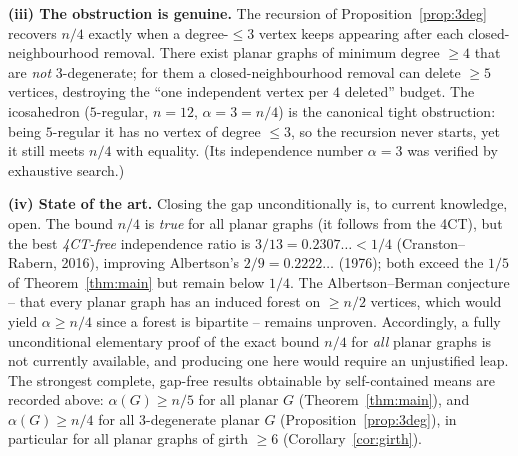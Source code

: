 \documentclass{amsart}
\theoremstyle{remark}
\begin{document}
\medskip
\noindent\textbf{(iii) The obstruction is genuine.}
The recursion of Proposition~\ref{prop:3deg} recovers $n/4$ exactly when a
degree-$\le3$ vertex keeps appearing after each closed-neighbourhood removal.
There exist planar graphs of minimum degree $\ge4$ that are \emph{not}
$3$-degenerate; for them a closed-neighbourhood removal can delete $\ge5$
vertices, destroying the ``one independent vertex per $4$ deleted'' budget. The
icosahedron ($5$-regular, $n=12$, $\alpha=3=n/4$) is the canonical tight
obstruction: being $5$-regular it has no vertex of degree $\le3$, so the
recursion never starts, yet it still meets $n/4$ with equality. (Its independence
number $\alpha=3$ was verified by exhaustive search.)

\medskip
\noindent\textbf{(iv) State of the art.}
Closing the gap unconditionally is, to current knowledge, open. The bound $n/4$
is \emph{true} for all planar graphs (it follows from the 4CT), but the best
\emph{4CT-free} independence ratio is $3/13=0.2307\ldots<1/4$ (Cranston--Rabern,
2016), improving Albertson's $2/9=0.2222\ldots$ (1976); both exceed the $1/5$ of
Theorem~\ref{thm:main} but remain below $1/4$. The Albertson--Berman conjecture --
that every planar graph has an induced forest on $\ge n/2$ vertices, which would
yield $\alpha\ge n/4$ since a forest is bipartite -- remains unproven.
Accordingly, a fully unconditional elementary proof of the exact bound $n/4$ for
\emph{all} planar graphs is not currently available, and producing one here would
require an unjustified leap. The strongest complete, gap-free results obtainable
by self-contained means are recorded above: $\alpha(G)\ge n/5$ for all planar $G$
(Theorem~\ref{thm:main}), and $\alpha(G)\ge n/4$ for all $3$-degenerate planar
$G$ (Proposition~\ref{prop:3deg}), in particular for all planar graphs of girth
$\ge6$ (Corollary~\ref{cor:girth}).
\end{document}
